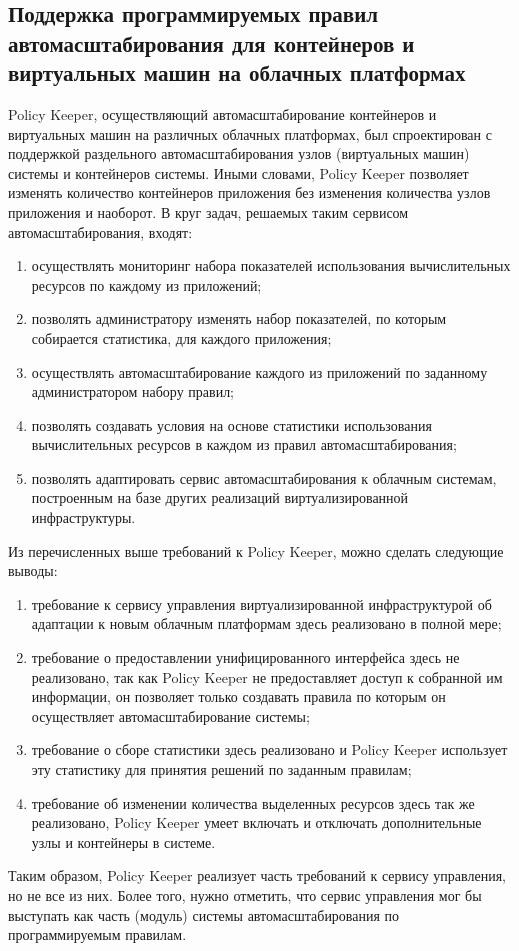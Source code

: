 \subsection{Поддержка программируемых правил автомасштабирования для контейнеров и виртуальных машин на облачных платформах}
Policy Keeper\cite{supporting-programmable-autoscaling}, осуществляющий автомасштабирование контейнеров и виртуальных машин на различных облачных платформах, был спроектирован с поддержкой раздельного автомасштабирования узлов (виртуальных машин) системы и контейнеров системы.
Иными словами, Policy Keeper позволяет изменять количество контейнеров приложения без изменения количества узлов приложения и наоборот.
В круг задач, решаемых таким сервисом автомасштабирования, входят:
\begin{enumerate}
    \item осуществлять мониторинг набора показателей использования вычислительных ресурсов по каждому из приложений;
    \item позволять администратору изменять набор показателей, по которым собирается статистика, для каждого приложения;
    \item осуществлять автомасштабирование каждого из приложений по заданному администратором набору правил;
    \item позволять создавать условия на основе статистики использования вычислительных ресурсов в каждом из правил автомасштабирования;
    \item позволять адаптировать сервис автомасштабирования к облачным системам, построенным на базе других реализаций виртуализированной инфраструктуры.
\end{enumerate}

Из перечисленных выше требований к Policy Keeper, можно сделать следующие выводы:
\begin{enumerate}
    \item требование к сервису управления виртуализированной инфраструктурой об адаптации к новым облачным платформам здесь реализовано в полной мере;
    \item требование о предоставлении унифицированного интерфейса здесь не реализовано, так как Policy Keeper не предоставляет доступ к собранной им информации, он позволяет только создавать правила по которым он осуществляет автомасштабирование системы;
    \item требование о сборе статистики здесь реализовано и Policy Keeper использует эту статистику для принятия решений по заданным правилам;
    \item требование об изменении количества выделенных ресурсов здесь так же реализовано, Policy Keeper умеет включать и отключать дополнительные узлы и контейнеры в системе.
\end{enumerate}

Таким образом, Policy Keeper реализует часть требований к сервису управления, но не все из них. Более того, нужно отметить, что сервис управления мог бы выступать как часть (модуль) системы автомасштабирования по программируемым правилам.

